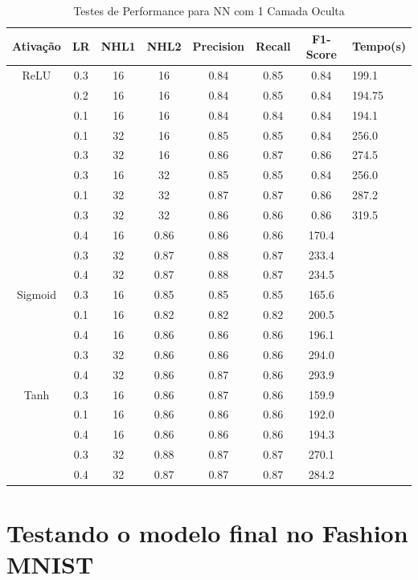 \documentclass[conference]{IEEEtran}
\begin{document}
\begin{table}[h!]
 \begin{center}
  \caption{Testes de Performance para NN com 1 Camada Oculta}
  \label{table:table1}
  \begin{tabular}{ |c|c|c|c|c|c|c| }
   \hline
   Ativação & LR & NHL1 & NHL2 & Precision & Recall & F1-Score & Tempo(s)\\
   \hline
   ReLU & 0.3 & 16 & 16 & 0.84 & 0.85 & 0.84 & 199.1 \\
        & 0.2 & 16 & 16 & 0.84 & 0.85 & 0.84 & 194.75 \\
        & 0.1 & 16 & 16 & 0.84 & 0.84 & 0.84 & 194.1 \\
        & 0.1 & 32 & 16 & 0.85 & 0.85 & 0.84 & 256.0 \\
        & 0.3 & 32 & 16 & 0.86 & 0.87 & 0.86 & 274.5 \\
        & 0.3 & 16 & 32 & 0.85 & 0.85 & 0.84 & 256.0 \\
        & 0.1 & 32 & 32 & 0.87 & 0.87 & 0.86 & 287.2 \\
        & 0.3 & 32 & 32 & 0.86 & 0.86 & 0.86 & 319.5 \\
                   & 0.4 & 16 & 0.86 & 0.86 & 0.86 & 170.4 \\
                   & 0.3 & 32 & 0.87 & 0.88 & 0.87 & 233.4 \\
                   & 0.4 & 32 & 0.87 & 0.88 & 0.87 & 234.5 \\
   \hline
   Sigmoid & 0.3 & 16 & 0.85 & 0.85 & 0.85 & 165.6 \\ 
                     & 0.1 & 16 & 0.82 & 0.82 & 0.82 & 200.5 \\
                     & 0.4 & 16 & 0.86 & 0.86 & 0.86 & 196.1 \\
                     & 0.3 & 32 & 0.86 & 0.86 & 0.86 & 294.0 \\
                     & 0.4 & 32 & 0.86 & 0.87 & 0.86 & 293.9 \\	
   \hline
   Tanh & 0.3 & 16 & 0.86 & 0.87 & 0.86 & 159.9 \\ 
                     & 0.1 & 16 & 0.86 & 0.86 & 0.86 & 192.0 \\
                     & 0.4 & 16 & 0.86 & 0.86 & 0.86 & 194.3 \\
                     & 0.3 & 32 & 0.88 & 0.87 & 0.87 & 270.1 \\
                     & 0.4 & 32 & 0.87 & 0.87 & 0.87 & 284.2 \\

 \hline
 \end{tabular}
 \end{center}
\end{table}
	
\section{Testando o modelo final no Fashion MNIST}

\printbibliography
\end{document}
